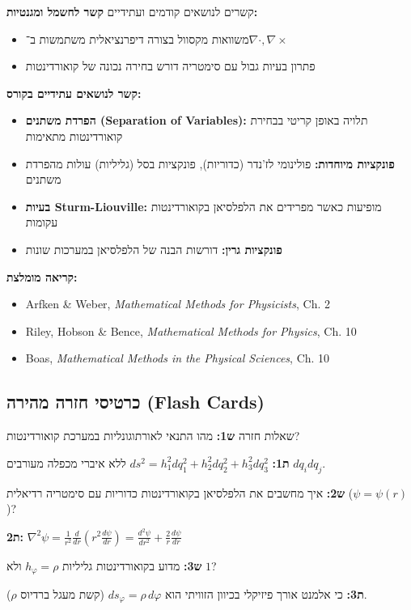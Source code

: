 \documentclass{article}
\begin{document}
\begin{summarybox}{קשרים לנושאים קודמים ועתידיים}
\textbf{קשר לחשמל ומגנטיות:}
\begin{itemize}
\item משוואות מקסוול בצורה דיפרנציאלית משתמשות ב־$\nabla\cdot, \nabla\times$
\item פתרון בעיות גבול עם סימטריה דורש בחירה נכונה של קואורדינטות
\end{itemize}

\textbf{קשר לנושאים עתידיים בקורס:}
\begin{itemize}
\item \textbf{הפרדת משתנים (Separation of Variables):} תלויה באופן קריטי בבחירת קואורדינטות מתאימות
\item \textbf{פונקציות מיוחדות:} פולינומי לז'נדר (כדוריות), פונקציות בסל (גליליות) עולות מהפרדת משתנים
\item \textbf{בעיות Sturm-Liouville:} מופיעות כאשר מפרידים את הלפלסיאן בקואורדינטות עקומות
\item \textbf{פונקציות גרין:} דורשות הבנה של הלפלסיאן במערכות שונות
\end{itemize}

\textbf{קריאה מומלצת:}
\begin{itemize}
\item Arfken \& Weber, \textit{Mathematical Methods for Physicists}, Ch. 2
\item Riley, Hobson \& Bence, \textit{Mathematical Methods for Physics}, Ch. 10
\item Boas, \textit{Mathematical Methods in the Physical Sciences}, Ch. 10
\end{itemize}
\end{summarybox}

\subsection*{כרטיסי חזרה מהירה (Flash Cards)}

\begin{mainbox}{שאלות חזרה}
\textbf{ש1:} מהו התנאי לאורתוגונליות במערכת קואורדינטות?

\textbf{ת1:} $ds^2 = h_1^2 dq_1^2 + h_2^2 dq_2^2 + h_3^2 dq_3^2$ ללא איברי מכפלה מעורבים $dq_i dq_j$.

\vspace{1em}

\textbf{ש2:} איך מחשבים את הלפלסיאן בקואורדינטות כדוריות עם סימטריה רדיאלית ($\psi = \psi(r)$)?

\textbf{ת2:} $\nabla^2\psi = \frac{1}{r^2}\frac{d}{dr}\left(r^2\frac{d\psi}{dr}\right) = \frac{d^2\psi}{dr^2} + \frac{2}{r}\frac{d\psi}{dr}$

\vspace{1em}

\textbf{ש3:} מדוע בקואורדינטות גליליות $h_\varphi = \rho$ ולא $1$?

\textbf{ת3:} כי אלמנט אורך פיזיקלי בכיוון הזוויתי הוא $ds_\varphi = \rho\, d\varphi$ (קשת מעגל ברדיוס $\rho$).
\end{mainbox}
\newpage
\end{document}
